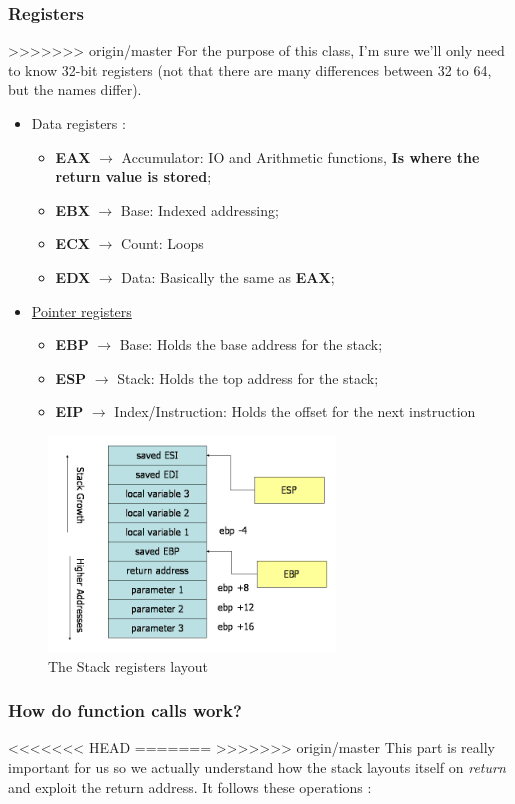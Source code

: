 \documentclass[11pt]{article}
\begin{document}
\subsubsection{Registers}
\label{sec:org55da36a}
>>>>>>> origin/master
For the purpose of this class, I'm sure we'll only need to know 32-bit registers (not that there are many differences between 32 to 64, but the names differ).
\begin{itemize}
\item Data registers \cite{guideX86}:
\begin{itemize}
\item \textbf{EAX} \(\to\) Accumulator: IO and Arithmetic functions, \textbf{Is where the return value is stored};
\item \textbf{EBX} \(\to\) Base: Indexed addressing;
\item \textbf{ECX} \(\to\) Count: Loops
\item \textbf{EDX} \(\to\) Data: Basically the same as \textbf{EAX};
\end{itemize}
\item \hyperref[StackReg]{Pointer registers}
\begin{itemize}
\item \textbf{EBP} \(\to\) Base: Holds the base address for the stack;
\item \textbf{ESP} \(\to\) Stack: Holds the top address for the stack;
\item \textbf{EIP} \(\to\) Index/Instruction: Holds the offset for the next instruction
\end{itemize}
\end{itemize}

\begin{figure}[htbp]
\centering
\includegraphics[width=3in]{stack-convention.png}
\caption{\label{StackReg}
The Stack registers layout}
\end{figure}

\subsubsection{How do function calls work?}
<<<<<<< HEAD
\label{sec:org7f67ebc}
=======
\label{sec:org6abfad5}
>>>>>>> origin/master
This part is really important for us so we actually understand how the stack layouts itself on \emph{return} and exploit the return address. It follows these operations \cite{functionCall}:
\end{document}
